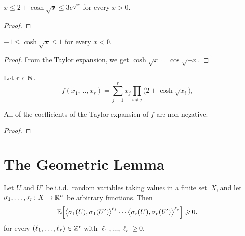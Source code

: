 \begin{lemma}
  \label{lem:coshsqrt-bd-pos}
  $x \le 2 + \cosh \sqrt{x} \le 3 e^{\sqrt{x}}$ for every $x > 0$.
\end{lemma}
\begin{proof}
\end{proof}

\begin{lemma}
  \label{lem:coshsqrt-bd-neg}
  $-1 \le \cosh \sqrt{x} \le 1$ for every $x < 0$.
\end{lemma}
\begin{proof}
  From the Taylor expansion, we get $\cosh \sqrt{x} = \cos \sqrt{-x}$.
\end{proof}

\begin{definition}
  \label{def:f}
  Let $r \in \mathbb{N}$.
  \begin{equation}\label{eq:f}
    f(x_1,\dots,x_r) = \sum_{j = 1}^r x_j \prod_{i \ne j} \big( 2 + \cosh\sqrt{x_i} \big),
  \end{equation}
\end{definition}

\begin{lemma}
  \label{lem:taylor-nonneg}
  All of the coefficients of the Taylor expansion of $f$ are non-negative.
\end{lemma}
\begin{proof}
\end{proof}


\section{The Geometric Lemma}

\begin{lemma}
  \label{lem:moments}
  Let $U$ and\/ $U'$ be i.i.d.~random variables taking values in a finite set~$X$, and let\/ $\sigma_1,\ldots,\sigma_r \colon X \rightarrow \mathbb{R}^n$ be arbitrary functions. Then
  $$\mathbb{E}\Big[ \big\langle \sigma_1(U),\sigma_1(U') \big\rangle^{\ell_1} \cdots \big\langle \sigma_r(U),\sigma_r(U') \big\rangle^{\ell_r} \Big] \geqslant 0.$$
  for every $(\ell_1,\dots,\ell_r) \in \mathbb{Z}^r$ with $\ell_1,\dots,\ell_r \ge 0$.
\end{lemma}

